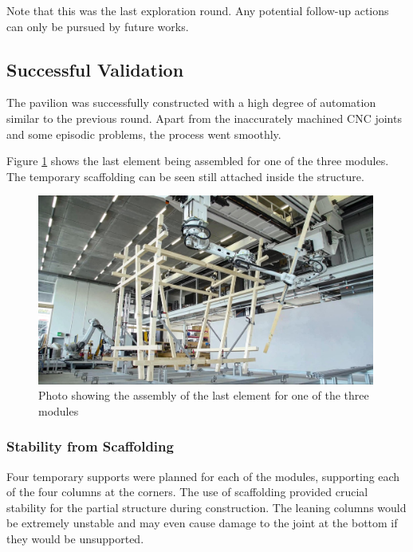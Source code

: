 Note that this was the last exploration round. Any potential follow-up actions can only be pursued by future works.

\subsection{Successful Validation}
\label{subsection:exploration-5-successful-validation}

The pavilion was successfully constructed with a high degree of automation similar to the previous round. Apart from the inaccurately machined CNC joints and some episodic problems, the process went smoothly. 

Figure \ref{fig:photo-last-element-assembly} shows the last element being assembled for one of the three modules. The temporary scaffolding can be seen still attached inside the structure. 

\begin{figure}[!h]
    \centering
    \includegraphics[width=0.99\textwidth]{images/08/img30.jpg}
    \caption{Photo showing the assembly of the last element for one of the three modules}
    \label{fig:photo-last-element-assembly}
\end{figure}

\subsubsection{Stability from Scaffolding}
\label{subsubsection:exploration-5-stability-from-scaffolding}

Four temporary supports were planned for each of the modules, supporting each of the four columns at the corners. The use of scaffolding provided crucial stability for the partial structure during construction. The leaning columns would be extremely unstable and may even cause damage to the joint at the bottom if they would be unsupported. 

